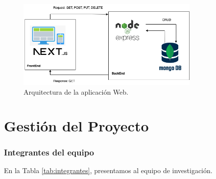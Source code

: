 \documentclass[a4paper]{article}
\begin{document}
\begin{figure}[H]
	\centering
	\includegraphics[width=0.8\textwidth]{../img/neoantigen/arquitectura.png}
	\caption{Arquitectura de la aplicación Web.}
	\label{fig:arquitectura}
\end{figure}


	
	
	

\clearpage


\part*{Gestión del Proyecto}

\setcounter{section}{0}


\section{Integrantes del equipo}
En la Tabla \ref{tab:integrantes}, presentamos al equipo de investigación.
\end{document}
